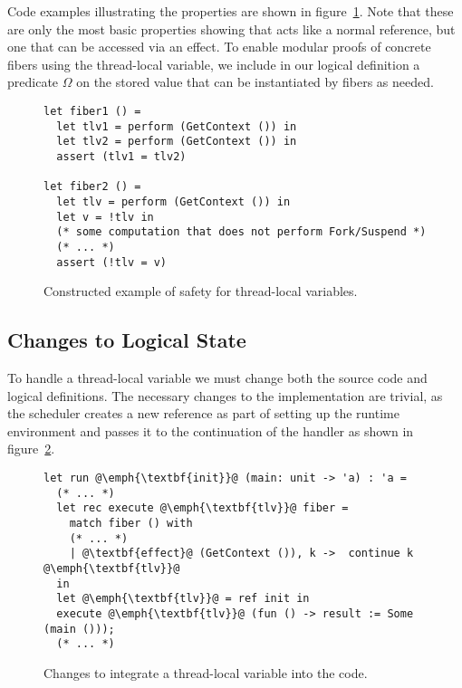 Code examples illustrating the properties are shown in figure~\ref{fig:tlv-example}.
Note that these are only the most basic properties showing that  acts like a normal reference, but one that can be accessed via an effect.
To enable modular proofs of concrete fibers using the thread-local variable, we include in our logical definition a predicate \(\Omega\) on the stored value that can be instantiated by fibers as needed.

\begin{figure}[ht]
    \begin{verbatim}
let fiber1 () =
  let tlv1 = perform (GetContext ()) in
  let tlv2 = perform (GetContext ()) in
  assert (tlv1 = tlv2)

let fiber2 () =
  let tlv = perform (GetContext ()) in
  let v = !tlv in
  (* some computation that does not perform Fork/Suspend *)
  (* ... *)
  assert (!tlv = v)
  \end{verbatim}
    \caption{Constructed example of safety for thread-local variables.}
    \label{fig:tlv-example}
\end{figure}

\subsection{Changes to Logical State}

To handle a thread-local variable we must change both the source code and logical definitions.
The necessary changes to the implementation are trivial, as the scheduler creates a new reference as part of setting up the runtime environment and passes it to the continuation of the \egetctx{} handler as shown in figure~\ref{fig:sched-run-tlv}.
\begin{figure}[H]
  \begin{verbatim}
let run @\emph{\textbf{init}}@ (main: unit -> 'a) : 'a =
  (* ... *)
  let rec execute @\emph{\textbf{tlv}}@ fiber = 
    match fiber () with
    (* ... *)
    | @\textbf{effect}@ (GetContext ()), k ->  continue k @\emph{\textbf{tlv}}@
  in
  let @\emph{\textbf{tlv}}@ = ref init in
  execute @\emph{\textbf{tlv}}@ (fun () -> result := Some (main ())); 
  (* ... *)
  \end{verbatim}
  \caption{Changes to integrate a thread-local variable into the  code.}
  \label{fig:sched-run-tlv}
\end{figure}

